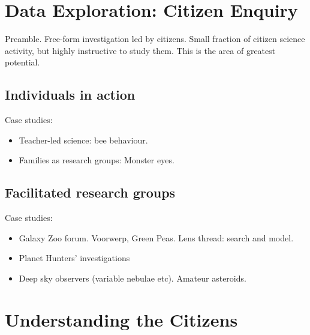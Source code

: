 \documentclass{ar2e}
\begin{document}

\section{Data Exploration: Citizen Enquiry}
\label{sec:explorers}

Preamble. Free-form investigation led by citizens. Small fraction of citizen
science activity, but highly instructive to study them. This is the area of
greatest potential.



\subsection{Individuals in action}
\label{sec:explorers:individuals}

Case studies:
\begin{itemize}
\item Teacher-led science: bee behaviour. 
\item Families as research groups: Monster eyes. %
\end{itemize}



\subsection{Facilitated research groups}
\label{sec:explorers:groups}

Case studies:
\begin{itemize}
\item Galaxy Zoo forum. Voorwerp, Green Peas. Lens thread: search and model.
\item Planet Hunters' investigations
\item Deep sky observers (variable nebulae etc). Amateur asteroids.
\end{itemize}


\section{Understanding the Citizens}
\label{sec:crowd}
\end{document}
